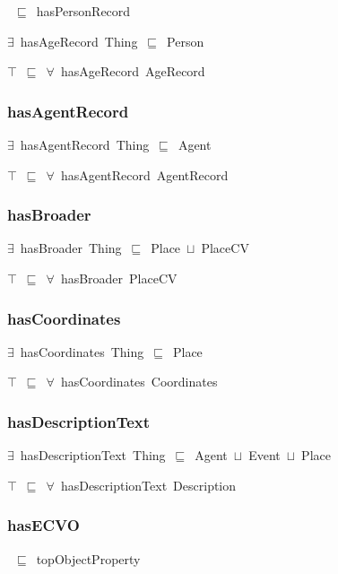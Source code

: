\documentclass{article}
\begin{document}
~\ensuremath{\sqsubseteq}~hasPersonRecord

\ensuremath{\exists}~hasAgeRecord~Thing~\ensuremath{\sqsubseteq}~Person

\ensuremath{\top}~\ensuremath{\sqsubseteq}~\ensuremath{\forall}~hasAgeRecord~AgeRecord

\subsubsection*{hasAgentRecord}

\ensuremath{\exists}~hasAgentRecord~Thing~\ensuremath{\sqsubseteq}~Agent

\ensuremath{\top}~\ensuremath{\sqsubseteq}~\ensuremath{\forall}~hasAgentRecord~AgentRecord

\subsubsection*{hasBroader}

\ensuremath{\exists}~hasBroader~Thing~\ensuremath{\sqsubseteq}~Place~\ensuremath{\sqcup}~PlaceCV

\ensuremath{\top}~\ensuremath{\sqsubseteq}~\ensuremath{\forall}~hasBroader~PlaceCV

\subsubsection*{hasCoordinates}

\ensuremath{\exists}~hasCoordinates~Thing~\ensuremath{\sqsubseteq}~Place

\ensuremath{\top}~\ensuremath{\sqsubseteq}~\ensuremath{\forall}~hasCoordinates~Coordinates

\subsubsection*{hasDescriptionText}

\ensuremath{\exists}~hasDescriptionText~Thing~\ensuremath{\sqsubseteq}~Agent~\ensuremath{\sqcup}~Event~\ensuremath{\sqcup}~Place

\ensuremath{\top}~\ensuremath{\sqsubseteq}~\ensuremath{\forall}~hasDescriptionText~Description

\subsubsection*{hasECVO}

~\ensuremath{\sqsubseteq}~topObjectProperty
\end{document}
